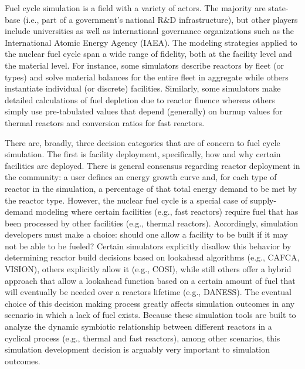 Fuel cycle simulation is a field with a variety of actors. The majority are
state-base (i.e., part of a government's national R\&D infrastructure), but
other players include universities as well as international governance
organizations such as the International Atomic Energy Agency (IAEA). The
modeling strategies applied to the nuclear fuel cycle span a wide range of
fidelity, both at the facility level and the material level. For instance, some
simulators describe reactors by fleet (or types) and solve material balances for
the entire fleet in aggregate while others instantiate individual (or discrete)
facilities. Similarly, some simulators make detailed calculations of fuel
depletion due to reactor fluence whereas others simply use pre-tabulated values
that depend (generally) on burnup values for thermal reactors and conversion
ratios for fast reactors.

There are, broadly, three decision categories that are of concern to fuel cycle
simulation. The first is facility deployment, specifically, how and why certain
facilities are deployed. There is general consensus regarding reactor deployment
in the community: a user defines an energy growth curve and, for each type of
reactor in the simulation, a percentage of that total energy demand to be met by
the reactor type. However, the nuclear fuel cycle is a special case of
supply-demand modeling where certain facilities (e.g., fast reactors) require
fuel that has been processed by other facilities (e.g., thermal
reactors). Accordingly, simulation developers must make a choice: should one
allow a facility to be built if it may not be able to be fueled? Certain
simulators explicitly disallow this behavior by determining reactor build
decisions based on lookahead algorithms (e.g., CAFCA, VISION), others explicitly
allow it (e.g., COSI), while still others offer a hybrid approach that allow a
lookahead function based on a certain amount of fuel that will eventually be
needed over a reactors lifetime (e.g., DANESS). The eventual choice of this
decision making process greatly affects simulation outcomes in any scenario in
which a lack of fuel exists. Because these simulation tools are built to analyze
the dynamic symbiotic relationship between different reactors in a cyclical
process (e.g., thermal and fast reactors), among other scenarios, this
simulation development decision is arguably very important to simulation
outcomes.

